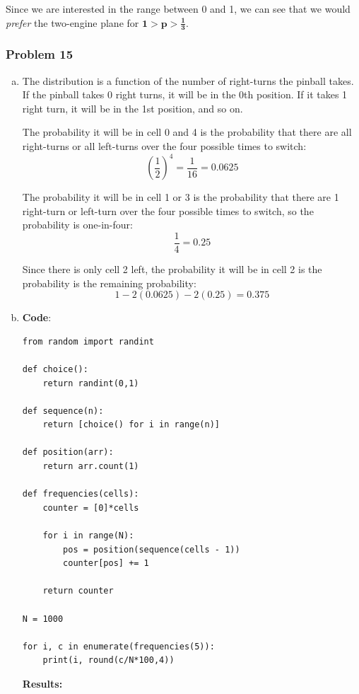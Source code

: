 \documentclass[11pt]{extarticle}
\begin{document}
Since we are interested in the range between 0 and 1, we can see that we would \textit{prefer} the two-engine plane for $\mathbf{1 > p > \frac{1}{3}}$. 

 \subsubsection*{Problem 15}

\begin{enumerate}[(a)]

\item The distribution is a function of the number of right-turns the pinball takes. If the pinball takes 0 right turns, it will be in the 0th position. If it takes 1 right turn, it will be in the 1st position, and so on. 

The probability it will be in cell 0 and 4 is the probability that there are all right-turns or all left-turns over the four possible times to switch: $$ \left( \frac{1}{2} \right)^4 = \frac{1}{16} = 0.0625$$

The probability it will be in cell 1 or 3 is the probability that there are 1 right-turn or left-turn over the four possible times to switch, so the probability is one-in-four: $$ \frac{1}{4} = 0.25 $$

Since there is only cell 2 left, the probability it will be in cell 2 is the probability is the remaining probability: $$  1 - 2(0.0625) - 2(0.25) = 0.375 $$

\item \textbf{Code}: 

\scriptsize 
\begin{verbatim}
from random import randint

def choice():
    return randint(0,1)

def sequence(n):
    return [choice() for i in range(n)]

def position(arr):
    return arr.count(1)

def frequencies(cells):
    counter = [0]*cells

    for i in range(N):
        pos = position(sequence(cells - 1))
        counter[pos] += 1

    return counter 

N = 1000

for i, c in enumerate(frequencies(5)):
    print(i, round(c/N*100,4))
\end{verbatim}
\normalsize

\textbf{Results:}
 

\end{enumerate}
\end{document}
